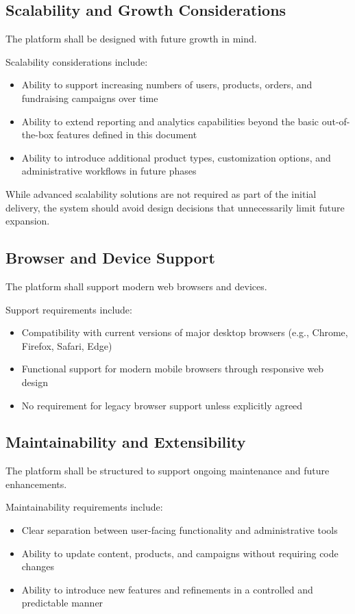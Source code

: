 \subsection{Scalability and Growth Considerations}

The platform shall be designed with future growth in mind.

Scalability considerations include:
\begin{itemize}[leftmargin=1.5em]
    \item Ability to support increasing numbers of users, products, orders, and
    fundraising campaigns over time
    \item Ability to extend reporting and analytics capabilities beyond the basic
    out-of-the-box features defined in this document
    \item Ability to introduce additional product types, customization options,
    and administrative workflows in future phases
\end{itemize}

While advanced scalability solutions are not required as part of the initial
delivery, the system should avoid design decisions that unnecessarily limit
future expansion.

\subsection{Browser and Device Support}

The platform shall support modern web browsers and devices.

Support requirements include:
\begin{itemize}[leftmargin=1.5em]
    \item Compatibility with current versions of major desktop browsers
    (e.g., Chrome, Firefox, Safari, Edge)
    \item Functional support for modern mobile browsers through responsive web
    design
    \item No requirement for legacy browser support unless explicitly agreed
\end{itemize}

\subsection{Maintainability and Extensibility}

The platform shall be structured to support ongoing maintenance and future
enhancements.

Maintainability requirements include:
\begin{itemize}[leftmargin=1.5em]
    \item Clear separation between user-facing functionality and administrative
    tools
    \item Ability to update content, products, and campaigns without requiring
    code changes
    \item Ability to introduce new features and refinements in a controlled and
    predictable manner
\end{itemize}
